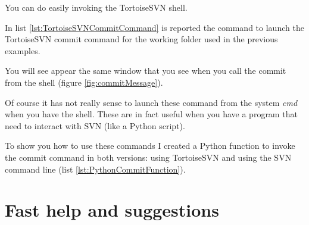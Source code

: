 You can do easily invoking the TortoiseSVN shell.\newline

In list \ref{lst:TortoiseSVNCommitCommand} is reported the command to launch the TortoiseSVN commit command for the working folder used in the previous examples.




You will see appear the same window that you see when you call the commit from the shell (figure \ref{fig:commitMessage}).



Of course it has not really sense to launch these command from the system \textit{cmd} when you have the shell. These are in fact useful when you have a program that need to interact with SVN (like a Python script).

To show you how to use these commands I created a Python function to invoke the commit command in both versions: using TortoiseSVN and using the SVN command line (list \ref{lst:PythonCommitFunction}).


\newpage





\newpage












\section{Fast help and suggestions}
\label{fastHelp}



